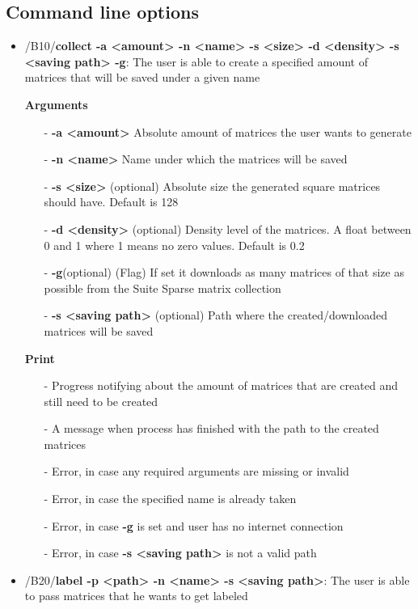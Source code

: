 \documentclass[parskip=full]{scrartcl}
\begin{document}
\subsection{Command line options}
\begin{itemize}
\item/B10/\textbf{collect -a <amount> -n <name> -s <size> -d <density> -s <saving path> -g}:
\newline The user is able to create a specified amount of matrices that will be saved under a given name

\textbf{Arguments}
	\begin{itemize}
	\item[-]\textbf{-a <amount>} Absolute amount of matrices the user wants to generate
	\item[-]\textbf{-n <name>} Name under which the matrices will be saved
	\item[-]\textbf{-s <size>} (optional) Absolute size the generated square matrices should have. Default is 128
	\item[-]\textbf{-d <density>} (optional) Density level of the matrices. A float between 0 and 1 where 1 means no zero values. Default is 0.2
	\item[-]\textbf{-g}(optional) (Flag) If set it downloads as many matrices of that size as possible from the \gls{Suite Sparse} matrix collection
	\item[-]\textbf{-s <saving path>} (optional) Path where the created/downloaded matrices will be saved
	\end{itemize}

\textbf{Print}
	\begin{itemize}
	\item[-]Progress notifying about the amount of matrices that are created and still need to be created
	\item[-]A message when process has finished with the path to the created matrices
	\item[-]Error, in case any required arguments are missing or invalid
	\item[-]Error, in case the specified name is already taken
	\item[-]Error, in case \textbf{-g} is set and user has no internet connection
	\item[-]Error, in case \textbf{-s <saving path>} is not a valid path
	\end{itemize}

\item/B20/\textbf{label -p <path> -n <name> -s <saving path>}:
\newline The user is able to pass matrices that he wants to get labeled


\end{itemize}
\end{document}
